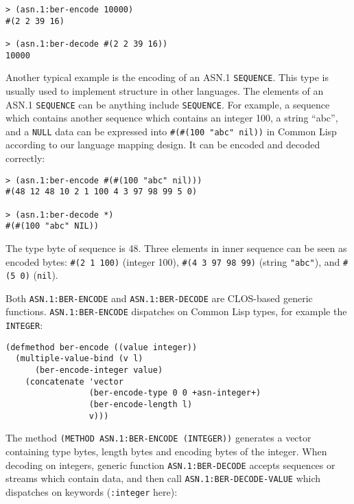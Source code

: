 \documentclass[reprint,9pt]{sigplanconf}
\begin{document}
\begin{verbatim}
> (asn.1:ber-encode 10000)
#(2 2 39 16)

> (asn.1:ber-decode #(2 2 39 16))
10000
\end{verbatim}

Another typical example is the encoding of an ASN.1 \texttt{SEQUENCE}.
This type is usually used to implement structure in other languages.
The elements of an ASN.1 \texttt{SEQUENCE} can be anything include
\texttt{SEQUENCE}.  For example, a sequence which contains another
sequence which contains an integer 100, a string ``abc'', and a
\texttt{NULL} data can be expressed into \texttt{\#(\#(100 "abc"
  nil))} in Common Lisp according to our language mapping design. It
can be encoded and decoded correctly:
%
\begin{verbatim}
> (asn.1:ber-encode #(#(100 "abc" nil)))
#(48 12 48 10 2 1 100 4 3 97 98 99 5 0)

> (asn.1:ber-decode *)
#(#(100 "abc" NIL))
\end{verbatim}

The type byte of sequence is 48. Three elements in inner sequence can
be seen as encoded bytes: \texttt{\#(2 1 100)} (integer 100),
\texttt{\#(4 3 97 98 99)} (string \texttt{"abc"}), and \texttt{\#(5 0)}
(\texttt{nil}).

Both \texttt{ASN.1:BER-ENCODE} and \texttt{ASN.1:BER-DECODE} are
CLOS-based generic functions. \texttt{ASN.1:BER-ENCODE} dispatches on
Common Lisp types, for example the \texttt{INTEGER}:

\begin{verbatim}
(defmethod ber-encode ((value integer))
  (multiple-value-bind (v l)
      (ber-encode-integer value)
    (concatenate 'vector
                 (ber-encode-type 0 0 +asn-integer+)
                 (ber-encode-length l)
                 v)))
\end{verbatim}

The method \texttt{(METHOD ASN.1:BER-ENCODE (INTEGER))} generates a
vector containing type bytes, length bytes and encoding bytes of the
integer. When decoding on integers, generic function
\texttt{ASN.1:BER-DECODE} accepts sequences or streams which contain
data, and then call \texttt{ASN.1:BER-DECODE-VALUE} which dispatches
on keywords (\texttt{:integer} here):
\end{document}
